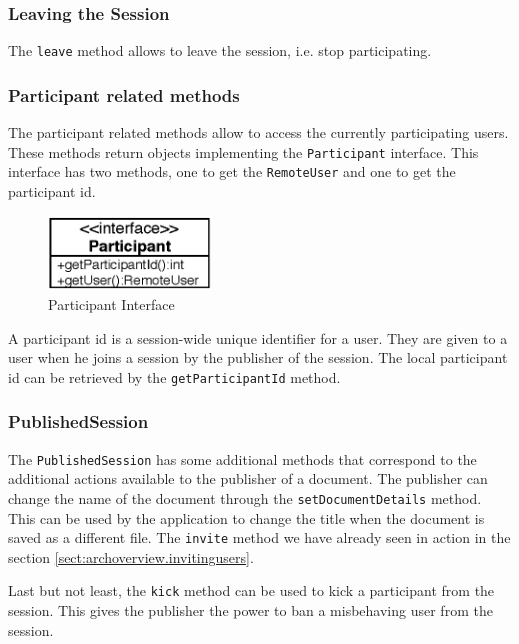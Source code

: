 \subsubsection{Leaving the Session}
The \texttt{leave} method allows to leave the session, i.e. stop participating. 

\subsubsection{Participant related methods}
The participant
related methods allow to access the currently participating users. These
methods return objects implementing the \texttt{Participant} interface. This
interface has two methods, one to get the \texttt{Remote\-User} and one to get 
the participant id.

\begin{figure}[H]
 \centering
 \includegraphics[width=4.34cm,height=1.98cm]{../images/finalreport/architecture_participant_uml.eps}
 \caption{Participant Interface}
\end{figure}

A participant id is a session-wide unique identifier for a user. They are given
to a user when he joins a session by the publisher of the session. The local
participant id can be retrieved by the \texttt{get\-Participant\-Id} method.


\subsubsection{PublishedSession}
The \texttt{Published\-Session} has some additional methods that correspond
to the additional actions available to the publisher of a document. The
publisher can change the name of the document through the
\texttt{set\-Document\-Details} method. This can be used by the application
to change the title when the document is saved as a different file.
The \texttt{invite} method we have already seen in action in the section
\ref{sect:archoverview.invitingusers}.

Last but not least, the \texttt{kick} method can be used to kick a
participant from the session. This gives the publisher the power to
ban a misbehaving user from the session.


